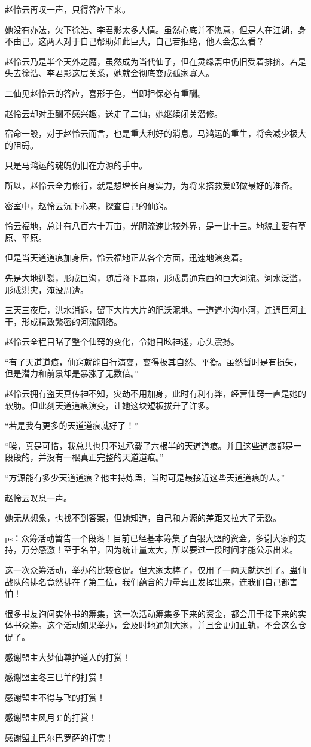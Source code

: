 \begin{this_body}
赵怜云再叹一声，只得答应下来。

她没有办法，欠下徐浩、李君影太多人情。虽然心底并不愿意，但是人在江湖，身不由己。这两人对于自己帮助如此巨大，自己若拒绝，他人会怎么看？

赵怜云乃是半个天外之魔，虽然成为当代仙子，但在灵缘斋中仍旧受着排挤。若是失去徐浩、李君影这层关系，她就会彻底变成孤家寡人。

二仙见赵怜云的答应，喜形于色，当即担保必有重酬。

赵怜云却对重酬不感兴趣，送走了二仙，她继续闭关潜修。

宿命一毁，对于赵怜云而言，也是重大利好的消息。马鸿运的重生，将会减少极大的阻碍。

只是马鸿运的魂魄仍旧在方源的手中。

所以，赵怜云全力修行，就是想增长自身实力，为将来搭救爱郎做最好的准备。

密室中，赵怜云沉下心来，探查自己的仙窍。

怜云福地，总计有八百六十万亩，光阴流速比较外界，是一比十三。地貌主要有草原、平原。

但是当天道道痕加身后，怜云福地正从各个方面，迅速地演变着。

先是大地迸裂，形成巨沟，随后降下暴雨，形成贯通东西的巨大河流。河水泛滥，形成洪灾，淹没周遭。

三天三夜后，洪水消退，留下大片大片的肥沃泥地。一道道小沟小河，连通巨河主干，形成精致繁密的河流网络。

赵怜云全程目睹了整个仙窍的变化，令她目眩神迷，心头震撼。

“有了天道道痕，仙窍就能自行演变，变得极其自然、平衡。虽然暂时是有损失，但是潜力和前景却是暴涨了无数倍。”

赵怜云拥有盗天真传神不知，灾劫不用加身，此时有利有弊，经营仙窍一直是她的软肋。但此刻天道道痕演变，让她这块短板拔升了许多。

“若是我有更多的天道道痕就好了！”

“唉，真是可惜，我总共也只不过承载了六根半的天道道痕。并且这些道痕都是一段段的，并没有一根真正完整的天道道痕。”

“方源能有多少天道道痕？他主持炼蛊，当时可是最接近这些天道道痕的人。”

赵怜云叹息一声。

她无从想象，也找不到答案，但她知道，自己和方源的差距又拉大了无数。

ps：众筹活动暂告一个段落！目前已经基本筹集了白银大盟的资金。多谢大家的支持，万分感激！至于名单，因为统计量太大，所以要过一段时间才能公示出来。

这一次众筹活动，举办的比较仓促。但大家太棒了，仅用了一两天就达到了。蛊仙战队的排名竟然排在了第二位，我们蕴含的力量真正发挥出来，连我们自己都害怕！

很多书友询问实体书的筹集，这一次活动筹集多下来的资金，都会用于接下来的实体书众筹。这个活动如果举办，会及时地通知大家，并且会更加正轨，不会这么仓促了。

感谢盟主大梦仙尊护道人的打赏！

感谢盟主冬三巳羊的打赏！

感谢盟主不得与飞的打赏！

感谢盟主风月￡的打赏！

感谢盟主巴尔巴罗萨的打赏！

\end{this_body}

